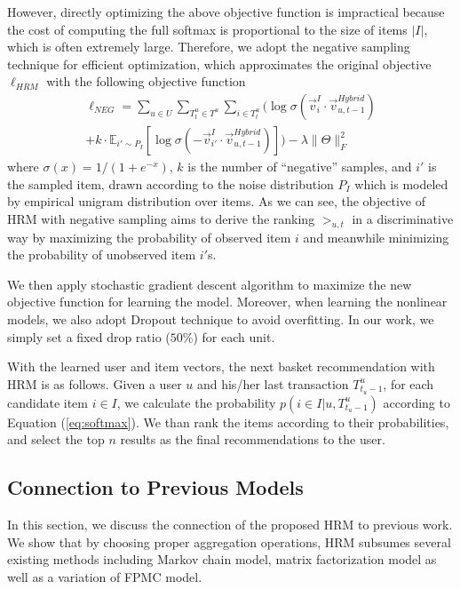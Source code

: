 \documentclass[10pt,journal,compsoc]{IEEEtran}
\begin{document}
However, directly optimizing the above objective function is impractical because the cost of computing the full softmax is proportional to the size of items $|I|$, which is often extremely large. Therefore, we adopt the negative sampling technique \cite{mikolov2014,mikolov2013} for efficient optimization, which approximates the original objective $\ell_{HRM}$ with the following objective function
\begin{displaymath}
    \begin{aligned}
  \ell_{NEG} = \sum_{u\in U}\sum_{T^u_t\in T^u} \sum_{i\in T^u_t}\Big( \log\sigma(\vec{v}^I_i\cdot\vec{v}^{Hybrid}_{u,t-1})
  \\+k\cdot \mathbb{E}_{i'\sim P_I}[\log\sigma(-\vec{v}^I_{i'}\cdot\vec{v}^{Hybrid}_{u,t-1})]\Big) -\lambda\|\Theta\|^2_F
   \end{aligned}
\end{displaymath}
where $\sigma(x)=1/(1+e^{-x})$, $k$ is the number of ``negative'' samples, and $i'$ is the sampled item, drawn according to the noise distribution $P_I$ which is modeled by empirical unigram distribution over items. As we can see, the objective of HRM with negative sampling aims to derive the ranking $>_{u,t}$ in a discriminative way by maximizing the probability of observed item $i$ and meanwhile minimizing the probability of unobserved item $i'$s.

We then apply stochastic gradient descent algorithm to maximize the new objective function for learning the model. Moreover, when learning the nonlinear models, we also adopt Dropout technique to avoid overfitting. In our work, we simply set a fixed drop ratio ($50\%$) for each unit.

With the learned user and item vectors, the next basket recommendation with HRM is as follows. Given a user $u$ and his/her last transaction $T_{t_u-1}^u$, for each candidate item $i\in I$, we calculate the probability $p(i\in I|u,T^u_{t_u-1})$ according to Equation (\ref{eq:softmax}). We than rank the items according to their probabilities, and select the top $n$ results as the final recommendations to the user.

\subsection{Connection to Previous Models}
In this section, we discuss the connection of the proposed HRM to previous work. We show that by choosing proper aggregation operations, HRM subsumes several existing methods including Markov chain model, matrix factorization model as well as a variation of FPMC model.
\end{document}
